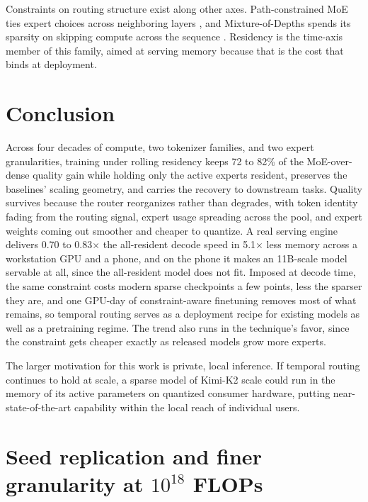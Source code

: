 \documentclass{article}
\begin{document}
Constraints on routing structure exist along other axes. Path-constrained MoE ties expert
choices across neighboring layers \citep{gu2026pathmoe}, and Mixture-of-Depths spends its
sparsity on skipping compute across the sequence \citep{raposo2024mod}. Residency is the
time-axis member of this family, aimed at serving memory because that is the cost that
binds at deployment.


\section{Conclusion}\label{sec:conclusion}

Across four decades of compute, two tokenizer families, and two expert granularities,
training under rolling residency keeps 72 to 82\% of the MoE-over-dense quality gain while
holding only the active experts resident, preserves the baselines' scaling geometry, and
carries the recovery to downstream tasks. Quality survives because the router reorganizes
rather than degrades, with token identity fading from the routing signal, expert usage
spreading across the pool, and expert weights coming out smoother and cheaper to quantize.
A real serving engine delivers 0.70 to 0.83$\times$ the all-resident decode speed in
5.1$\times$ less memory across a workstation GPU and a phone, and on the phone it makes an
11B-scale model servable at all, since the all-resident model does not fit. Imposed at
decode time, the same constraint costs modern sparse checkpoints a few points, less the
sparser they are, and one GPU-day of constraint-aware finetuning removes most of what
remains, so temporal routing serves as a deployment recipe for existing models as well as a
pretraining regime. The trend also runs in the technique's favor, since the constraint gets
cheaper exactly as released models grow more experts.

The larger motivation for this work is private, local inference. If temporal routing
continues to hold at scale, a sparse model of Kimi-K2 scale \citep{kimik2} could run in the
memory of its active parameters on quantized consumer hardware, putting
near-state-of-the-art capability within the local reach of individual users.





\appendix

\section{Seed replication and finer granularity at $10^{18}$ FLOPs}\label{app:seeds}
\end{document}
